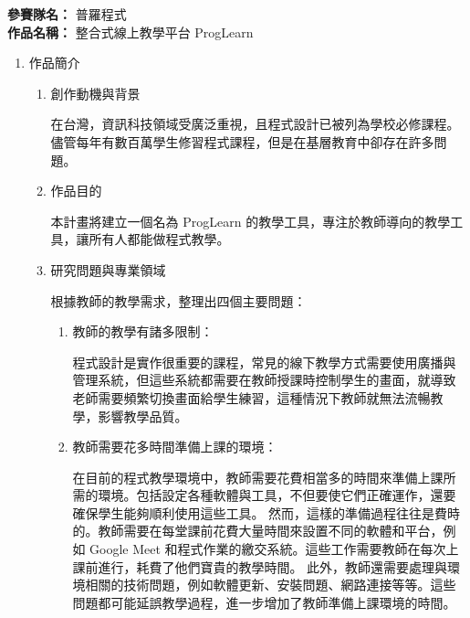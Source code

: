 \documentclass[12pt]{article}
\begin{document}
\date{}
\usetikzlibrary{automata, positioning, arrows}
{}

\noindent
\textbf{參賽隊名：} 普羅程式 \\
\textbf{作品名稱：} 整合式線上教學平台 ProgLearn

\begin{enumerate}
  \setlength{\parindent}{2em}
  \item 作品簡介
  \begin{enumerate}
    \setlength{\parindent}{2em}
    \item 創作動機與背景
    \par 在台灣，資訊科技領域受廣泛重視，且程式設計已被列為學校必修課程\cite{ref2}。
    儘管每年有數百萬學生修習程式課程\cite{ref3}，但是在基層教育中卻存在許多問題。
    \item 作品目的
    \par 本計畫將建立一個名為 ProgLearn 的教學工具，專注於教師導向的教學工具，讓所有人都能做程式教學。
    \item 研究問題與專業領域
    \par 根據教師的教學需求，整理出四個主要問題：
    \begin{enumerate}[label=(\arabic*)]
      \setlength{\parindent}{2em}
      \item 教師的教學有諸多限制：
        \par 程式設計是實作很重要的課程，常見的線下教學方式需要使用廣播與管理系統，但這些系統都需要在教師授課時控制學生的畫面，就導致老師需要頻繁切換畫面給學生練習，這種情況下教師就無法流暢教學，影響教學品質。
      \item 教師需要花多時間準備上課的環境：
        \par 在目前的程式教學環境中，教師需要花費相當多的時間來準備上課所需的環境。包括設定各種軟體與工具，不但要使它們正確運作，還要確保學生能夠順利使用這些工具。
        然而，這樣的準備過程往往是費時的。教師需要在每堂課前花費大量時間來設置不同的軟體和平台，例如 Google Meet 和程式作業的繳交系統。這些工作需要教師在每次上課前進行，耗費了他們寶貴的教學時間。
        此外，教師還需要處理與環境相關的技術問題，例如軟體更新、安裝問題、網路連接等等。這些問題都可能延誤教學過程，進一步增加了教師準備上課環境的時間。

\end{enumerate}
\end{enumerate}
\end{enumerate}
\end{document}
